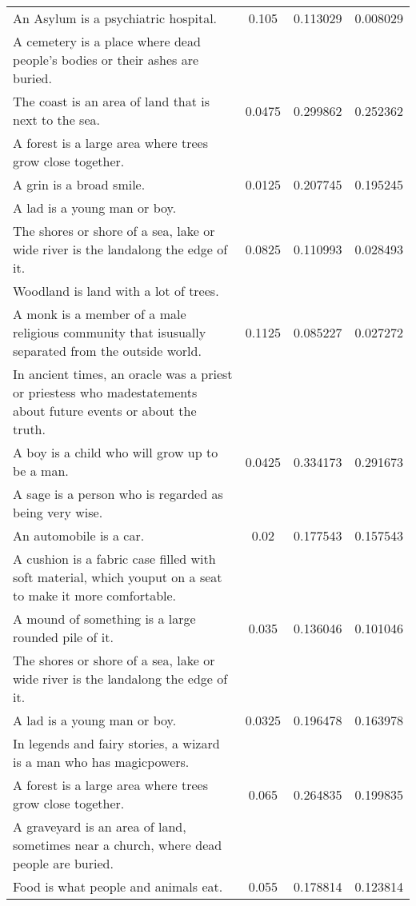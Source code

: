 \begin{center}
{\begin{longtable}{|p{9cm}|c|c|c|}
\hline
An Asylum is a psychiatric hospital. & 0.105 & 0.113029 & 0.008029 \\
A cemetery is a place where dead people's bodies or their ashes are buried. & & & \\
\hline
The coast is an area of land that is next to the sea. & 0.0475 & 0.299862 & 0.252362 \\
A forest is a large area where trees grow close together. & & & \\
\hline
A grin is a broad smile. & 0.0125 & 0.207745 & 0.195245 \\
A lad is a young man or boy. & & & \\
\hline
The shores or shore of a sea, lake or wide river is the landalong the edge of it. & 0.0825 & 0.110993 & 0.028493 \\
Woodland is land with a lot of trees. & & & \\
\hline
A monk is a member of a male religious community that isusually separated from the outside world. & 0.1125 & 0.085227 & 0.027272 \\
In ancient times, an oracle was a priest or priestess who madestatements about future events or about the truth. & & & \\
\hline
A boy is a child who will grow up to be a man. & 0.0425 & 0.334173 & 0.291673 \\
A sage is a person who is regarded as being very wise. & & & \\
\hline
An automobile is a car. & 0.02 & 0.177543 & 0.157543 \\
A cushion is a fabric case filled with soft material, which youput on a seat to make it more comfortable. & & & \\
\hline
A mound of something is a large rounded pile of it. & 0.035 & 0.136046 & 0.101046 \\
The shores or shore of a sea, lake or wide river is the landalong the edge of it. & & & \\
\hline
A lad is a young man or boy. & 0.0325 & 0.196478 & 0.163978 \\
In legends and fairy stories, a wizard is a man who has magicpowers. & & & \\
\hline
A forest is a large area where trees grow close together. & 0.065 & 0.264835 & 0.199835 \\
A graveyard is an area of land, sometimes near a church, where dead people are buried. & & & \\
\hline
Food is what people and animals eat. & 0.055 & 0.178814 & 0.123814 \\

\end{longtable}}
\end{center}
